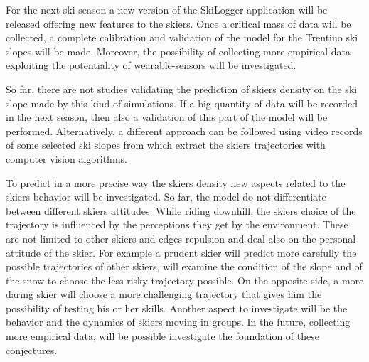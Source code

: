 \documentclass[12pt,a4paper,twoside]{book}
\begin{document}
For the next ski season a new version of the SkiLogger application will be released offering new features to the skiers. Once a critical mass of data will be collected, a complete calibration and validation of the model for the Trentino ski slopes will be made. Moreover, the possibility of collecting more empirical data exploiting the potentiality of wearable-sensors will be investigated.

So far, there are not studies validating the prediction of skiers density on the ski slope made by this kind of simulations. If a big quantity of data will be recorded in the next season, then also a validation of this part of the model will be performed. Alternatively, a different approach can be followed using video records of some selected ski slopes from which extract the skiers trajectories with computer vision algorithms.

To predict in a more precise way the skiers density new aspects related to the skiers behavior will be investigated. So far, the model do not differentiate between different skiers attitudes. While riding downhill, the skiers choice of the trajectory is influenced by the perceptions they get by the environment. These are not limited to other skiers and edges repulsion and deal also on the personal attitude of the skier. For example a prudent skier will predict more carefully the possible trajectories of other skiers, will examine the condition of the slope and of the snow to choose the less risky trajectory possible. On the opposite side, a more daring skier will choose a more challenging trajectory that gives him the possibility of testing his or her skills. Another aspect to investigate will be the behavior and the dynamics of skiers moving in groups. In the future, collecting more empirical data, will be possible investigate the foundation of these conjectures.


\end{document}
